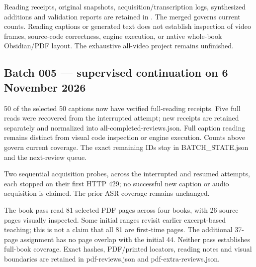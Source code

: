 Reading receipts, original snapshots, acquisition/transcription logs, synthesized additions and validation reports are retained in . The merged  governs current counts. Reading captions or generated text does not establish inspection of video frames, source-code correctness, engine execution, or native whole-book Obsidian/PDF layout. The exhaustive all-video project remains unfinished.

\subsection{Batch 005 --- supervised continuation on 6 November 2026}\label{appendix-877738f6f4d2-batch-005-supervised-continuation-on-6-november-2026}

\hypertarget{appendix-877738f6f4d2-batch-005-supervised-continuation-on-6-november-2026}{}

50 of the selected 50 captions now have verified full-reading receipts. Five full reads were recovered from the interrupted attempt; new receipts are retained separately and normalized into all-completed-reviews.json. Full caption reading remains distinct from visual code inspection or engine execution. Counts above govern current coverage. The exact remaining IDs stay in BATCH\_STATE.json and the next-review queue.

Two sequential acquisition probes, across the interrupted and resumed attempts, each stopped on their first HTTP 429; no successful new caption or audio acquisition is claimed. The prior ASR coverage remains unchanged.

The book pass read 81 selected PDF pages across four books, with 26 source pages visually inspected. Some initial ranges revisit earlier excerpt-based teaching; this is not a claim that all 81 are first-time pages. The additional 37-page assignment has no page overlap with the initial 44. Neither pass establishes full-book coverage. Exact hashes, PDF/printed locators, reading notes and visual boundaries are retained in pdf-reviews.json and pdf-extra-reviews.json.

